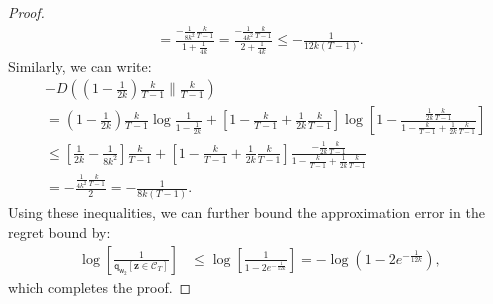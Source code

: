 \documentclass{article}
\newcommand{\sC}{\mathscr C}
\newcommand{\bz}{{\mathbf z}}
\newcommand{\sfq}{{\mathsf q}}
\newcommand{\sfw}{{\mathsf w}}
\newcommand{\ignore}[1]{}
\begin{document}
\begin{proof}
\begin{align*}
    = \frac{ - \frac{1}{8k^2} \frac{k}{T-1}}{1 + \frac{1}{4k}} 
    = \frac{ - \frac{1}{4k^2} \frac{k}{T-1}}{2 + \frac{1}{4k}} 
    \leq  - \frac{1}{12 k(T-1)}.
  \end{align*}
  Similarly, we can write:
  \begin{align*}
    & -D \left( \left(1 - \frac{1}{2k} \right) \frac{k}{T-1} \bigg \| \frac{k}{T-1} \right) \\
\ignore{
    & = \left(1 - \frac{1}{2k} \right) \frac{k}{T-1} \log
      \frac{\frac{k}{T-1}}{\left(1 - \frac{1}{2k} \right)
      \frac{k}{T-1}} + \left(1 - \left(1 - \frac{1}{2k}
      \right)\frac{k}{T-1}\right) \log \frac{1 - \frac{k}{T-1}}{1 -
      \left(1 - \frac{1}{2k} \right)\frac{k}{T-1}} \\
}
    & = \left(1 - \frac{1}{2k} \right) \frac{k}{T-1} \log \frac{1}{1 - \frac{1}{2k}} + \left[ 1- \frac{k}{T-1} + \frac{1}{2k} \frac{k}{T-1} \right] \log \left[1 - \frac{\frac{1}{2k}\frac{k}{T-1} }{1 - \frac{k}{T-1} + \frac{1}{2k} \frac{k}{T-1}} \right] \\
    & \leq \left[ \frac{1}{2k} - \frac{1}{8k^2} \right] \frac{k}{T-1}
      + \left[ 1 - \frac{k}{T-1} + \frac{1}{2k} \frac{k}{T-1} \right]
      \frac{-\frac{1}{2k} \frac{k}{T-1}}{1 - \frac{k}{T-1} +
      \frac{1}{2k} \frac{k}{T-1}} \\
    & = -\frac{ \frac{1}{4k^2} \frac{k}{T-1} }{2} = -\frac{1}{8k (T-1)}.
\end{align*}
Using these inequalities, we can further bound the approximation error
in the regret bound by:
\begin{align*}
    \log\left[ \frac{1}{\sfq_{\sfw_2}[\bz \in \sC_T]} \right]
    & \leq \log\left[ \frac{1}{1 - 2e^{-\frac{1}{12k}}} \right]
    = - \log \left( 1 - 2e^{-\frac{1}{12k}} \right),
\end{align*}
which completes the proof.
\end{proof}
\end{document}
